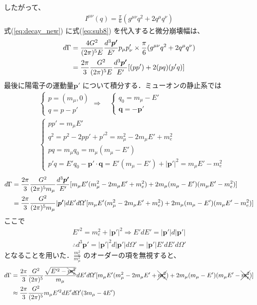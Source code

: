 したがって、
\begin{align}
  I^{\mu\nu}(q)=\frac{\pi}{6}(g^{\mu\nu}q^{2}+2q^{\mu}q^{\nu})\label{eq:sub8}
\end{align}
%
式(\ref{eq:decay_new}) に式(\ref{eq:sub8}) を代入すると微分崩壊幅は、
%
\begin{align}
  d\Gamma&=\frac{4G^{2}}{(2\pi)^{5}E}\frac{d^{3}\bm{p'}}{E'}p_{\mu}p'_{\nu}\times \frac{\pi}{6}(g^{\mu\nu}q^{2}+2q^{\mu}q^{\nu})\notag\\
  &=\frac{2\pi}{3}\frac{G^{2}}{(2\pi)^{5}E}\frac{d^{3}\bm{p'}}{E'}[(pp')+2(pq)(p'q)]
\end{align}
%
最後に陽電子の運動量$\bm{p'}$ について積分する．ミューオンの静止系では
\begin{align*}
  &\begin{cases}
    p=(m_{\mu},0)\\
    q=p-p'
  \end{cases}
  \Rightarrow\quad
  \begin{cases}
    q_{0}=m_{\mu}-E'\\
    \bm{q}=-\bm{p'}
  \end{cases}\\
  &\begin{cases}
    pp'=m_{\mu}E'\\
    q^{2}=p^{2}-2pp'+p'^{2}=m_{\mu}^{2}-2m_{\mu}E'+m_{e}^{2}\\
    pq=m_{\mu}q_{0}=m_{\mu}(m_{\mu}-E')\\
    p'q=E'q_{0}-\bm{p'\cdot q}=E'(m_{\mu}-E')+|\bm{p'}|^{2}=m_{\mu}E'-m_{e}^{2}
  \end{cases}
\end{align*}
%
\begin{align}
  d\Gamma&=\frac{2\pi}{3}\frac{G^{2}}{(2\pi)^{5}m_{\mu}}\frac{d^{3}\bm{p'}}{E'}[m_{\mu}E'(m_{\mu}^{2}-2m_{\mu}E'+m_{e}^{2})+2m_{\mu}(m_{\mu}-E')(m_{\mu}E'-m_{e}^{2})]\notag\\
  &=\frac{2\pi}{3}\frac{G^{2}}{(2\pi)^{5}m_{\mu}}|\bm{p'}|dE'd\Omega'[m_{\mu}E'(m_{\mu}^{2}-2m_{\mu}E'+m_{e}^{2})+2m_{\mu}(m_{\mu}-E')(m_{\mu}E'-m_{e}^{2})]
\end{align}
%
ここで
\begin{align*}
  E'^{2}=m_{e}^{2}+|\bm{p'}|^{2}\Rightarrow E'dE'=|\bm{p'}|d|\bm{p'}|\\
  \therefore d^{3}\bm{p'}=|\bm{p'}|^{2}d|\bm{p'}|d\Omega'=|\bm{p'}|E'dE'd\Omega'
\end{align*}
となることを用いた．$\frac{m_{e}^{2}}{m_{\mu}^{2}}$ のオーダーの項を無視すると、
%
\begin{align}
  d\Gamma&=\frac{2\pi}{3}\frac{G^{2}}{(2\pi)^{5}}\frac{\sqrt{E'^{2}-\xcancel{m_{e}^{2}}}}{m_{\mu}}dE'd\Omega'[m_{\mu}E'(m_{\mu}^{2}-2m_{\mu}E'+\xcancel{m_{e}^{2}})+2m_{\mu}(m_{\mu}-E')(m_{\mu}E'-\xcancel{m_{e}^{2}})]\notag\\
  &\approx\frac{2\pi}{3}\frac{G^{2}}{(2\pi)^{5}}m_{\mu}E'^{2}dE'd\Omega'(3m_{\mu}-4E')
\end{align}
